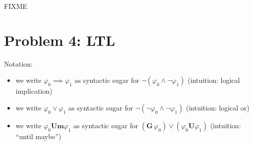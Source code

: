 \documentclass[a4paper,parskip,headheight=38pt]{scrartcl} %
\begin{document}
FIXME


\section*{Problem 4: LTL}

\newcommand{\ltlbinop}[1]{\mathbin{\ensuremath{\mathbf{{#1}}}}}
\newcommand{\ltlunop}[1]{\mathopen{\ensuremath{\mathbf{{#1}}}}\,}
\newcommand{\ltlG}{\ltlunop{G}}
\newcommand{\ltlF}{\ltlunop{F}}
\newcommand{\ltlX}{\ltlunop{X}}
\newcommand{\ltlU}{\ltlbinop{U}}
\newcommand{\ltlUm}{\ltlbinop{Um}}

Notation:
\begin{itemize}
    \item we write $\varphi_0 \implies \varphi_1$ as syntactic sugar for $\neg(\varphi_0 \land \neg \varphi_1)$ (intuition: logical implication)
    \item we write $\varphi_0 \lor \varphi_1$ as syntactic sugar for $\neg(\neg\varphi_0 \land \neg\varphi_1)$ (intuition: logical or)
    \item we write $\varphi_0 \ltlUm \varphi_1$ as syntactic sugar for $(\ltlG{} \varphi_0) \lor (\varphi_0 \ltlU \varphi_1)$ (intuition: \enquote{until maybe})
\end{itemize}
\end{document}

